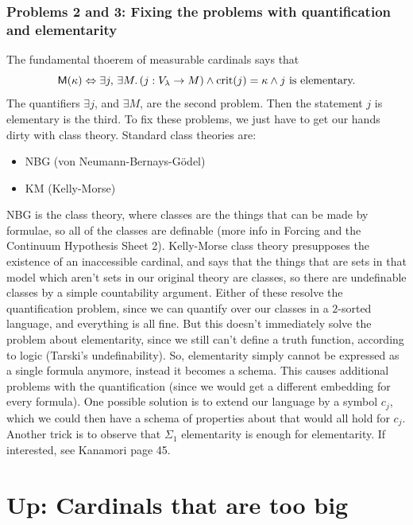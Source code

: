 \documentclass{article}
\begin{document}
\subsubsection{Problems 2 and 3: Fixing the problems with quantification and elementarity}
The fundamental thoerem of measurable cardinals says that \[ \mathsf{M}(\kappa) \Leftrightarrow \exists j, \, \exists M. \, (j : V_{\lambda} \to M) \wedge \operatorname{crit}(j)=\kappa \wedge j \text{ is elementary.}\] 
The quantifiers $\exists j$, and $\exists M$, are the second problem. Then the statement $j$ is elementary is the third. To fix these problems, we just have to get our hands dirty with class theory. \gap 
Standard class theories are: 
\begin{itemize}
    \item NBG (von Neumann-Bernays-G\"odel)
    \item KM (Kelly-Morse)
\end{itemize}
NBG is the  class theory, where classes are the things that can be made by formulae, so all of the classes are definable (more info in Forcing and the Continuum Hypothesis Sheet 2). Kelly-Morse class theory presupposes the existence of an inaccessible cardinal, and says that the things that are sets in that model which aren't sets in our original theory are classes, so there are undefinable classes by a simple countability argument. \gap 
Either of these resolve the quantification problem, since we can quantify over our classes in a $2$-sorted language, and everything is all fine. But this doesn't immediately solve the problem about elementarity, since we still can't define a truth function, according to logic (Tarski's undefinability).\gap 
So, elementarity simply cannot be expressed as a single formula anymore, instead it becomes a schema. This causes additional problems with the quantification (since we would get a different embedding for every formula). One possible solution is to extend our language by a symbol $c_{j}$, which we could then have a schema of properties about that would all hold for $c_{j}$. Another trick is to observe that $\Sigma_{1}$ elementarity is enough for elementarity. If interested, see Kanamori page 45.
\newlec 
\section{Up: Cardinals that are too big}
\end{document}
